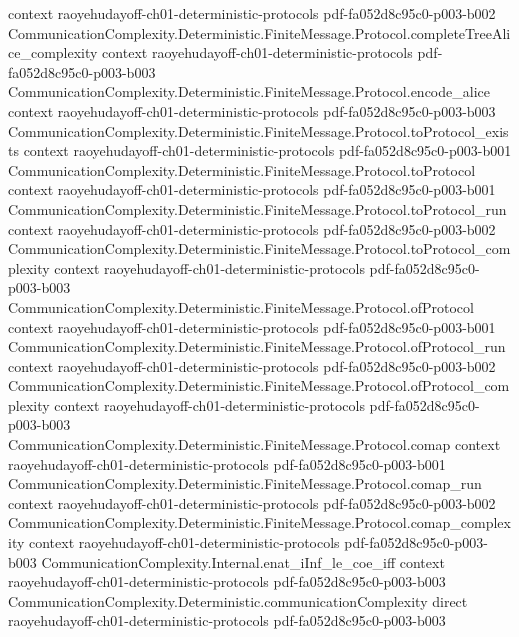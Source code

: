\begin{theorem}
  {context}
  {raoyehudayoff-ch01-deterministic-protocols}
  {pdf-fa052d8c95c0-p003-b002}
\proofstep
  {CommunicationComplexity.Deterministic.FiniteMessage.Protocol.completeTreeAlice_complexity}
  {context}
  {raoyehudayoff-ch01-deterministic-protocols}
  {pdf-fa052d8c95c0-p003-b003}
\proofstep
  {CommunicationComplexity.Deterministic.FiniteMessage.Protocol.encode_alice}
  {context}
  {raoyehudayoff-ch01-deterministic-protocols}
  {pdf-fa052d8c95c0-p003-b003}
\proofstep
  {CommunicationComplexity.Deterministic.FiniteMessage.Protocol.toProtocol_exists}
  {context}
  {raoyehudayoff-ch01-deterministic-protocols}
  {pdf-fa052d8c95c0-p003-b001}
\proofstep
  {CommunicationComplexity.Deterministic.FiniteMessage.Protocol.toProtocol}
  {context}
  {raoyehudayoff-ch01-deterministic-protocols}
  {pdf-fa052d8c95c0-p003-b001}
\proofstep
  {CommunicationComplexity.Deterministic.FiniteMessage.Protocol.toProtocol_run}
  {context}
  {raoyehudayoff-ch01-deterministic-protocols}
  {pdf-fa052d8c95c0-p003-b002}
\proofstep
  {CommunicationComplexity.Deterministic.FiniteMessage.Protocol.toProtocol_complexity}
  {context}
  {raoyehudayoff-ch01-deterministic-protocols}
  {pdf-fa052d8c95c0-p003-b003}
\proofstep
  {CommunicationComplexity.Deterministic.FiniteMessage.Protocol.ofProtocol}
  {context}
  {raoyehudayoff-ch01-deterministic-protocols}
  {pdf-fa052d8c95c0-p003-b001}
\proofstep
  {CommunicationComplexity.Deterministic.FiniteMessage.Protocol.ofProtocol_run}
  {context}
  {raoyehudayoff-ch01-deterministic-protocols}
  {pdf-fa052d8c95c0-p003-b002}
\proofstep
  {CommunicationComplexity.Deterministic.FiniteMessage.Protocol.ofProtocol_complexity}
  {context}
  {raoyehudayoff-ch01-deterministic-protocols}
  {pdf-fa052d8c95c0-p003-b003}
\proofstep
  {CommunicationComplexity.Deterministic.FiniteMessage.Protocol.comap}
  {context}
  {raoyehudayoff-ch01-deterministic-protocols}
  {pdf-fa052d8c95c0-p003-b001}
\proofstep
  {CommunicationComplexity.Deterministic.FiniteMessage.Protocol.comap_run}
  {context}
  {raoyehudayoff-ch01-deterministic-protocols}
  {pdf-fa052d8c95c0-p003-b002}
\proofstep
  {CommunicationComplexity.Deterministic.FiniteMessage.Protocol.comap_complexity}
  {context}
  {raoyehudayoff-ch01-deterministic-protocols}
  {pdf-fa052d8c95c0-p003-b003}
\proofstep
  {CommunicationComplexity.Internal.enat_iInf_le_coe_iff}
  {context}
  {raoyehudayoff-ch01-deterministic-protocols}
  {pdf-fa052d8c95c0-p003-b003}
\proofstep
  {CommunicationComplexity.Deterministic.communicationComplexity}
  {direct}
  {raoyehudayoff-ch01-deterministic-protocols}
  {pdf-fa052d8c95c0-p003-b003}
\proofstep

\end{theorem}
